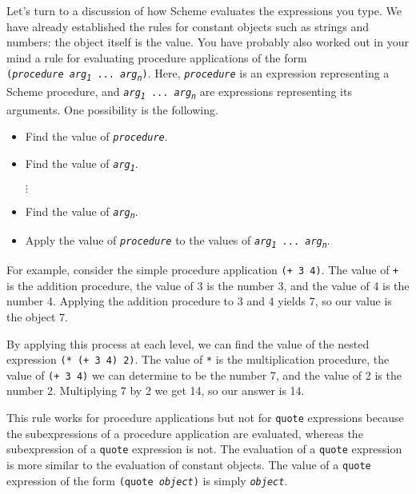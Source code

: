 Let's turn to a discussion of how Scheme evaluates the expressions
you type.
We have already established the rules for \label{start_s42}constant objects
such as strings and numbers: the object itself is the value.
You have probably also worked out in your mind a rule for evaluating
\label{start_s43}procedure applications of the form
\texttt{(\textit{procedure} \textit{arg\textsubscript{1}} ... \textit{arg\textsubscript{n}})}.
Here, \texttt{\textit{procedure}} is an expression representing a Scheme procedure,
and \texttt{\textit{arg\textsubscript{1}} ... \textit{arg\textsubscript{n}}} are expressions representing its
arguments.
One possibility is the following.

\begin{itemize}
\item 
Find the value of \texttt{\textit{procedure}}.

\item 
Find the value of \texttt{\textit{arg\textsubscript{1}}}.

\(\vdots\)
\item 
Find the value of \texttt{\textit{arg\textsubscript{n}}}.

\item 
Apply the value of \texttt{\textit{procedure}} to the values
of \texttt{\textit{arg\textsubscript{1}} ... \textit{arg\textsubscript{n}}}.

\end{itemize}


For example, consider the simple procedure application \texttt{(+ 3 4)}.
The value of \texttt{+} is the addition procedure, the value of 3
is the number 3, and the value of 4 is the number 4.
Applying the addition procedure to 3 and 4 yields 7, so our value
is the object 7.


By applying this process at each level, we can find the value of the
nested expression \texttt{(* (+ 3 4) 2)}.
The value of \texttt{*} is the multiplication procedure, the value of
\texttt{(+ 3 4)} we can determine to be the number 7, and the
value of 2 is the number 2.
Multiplying 7 by 2 we get 14, so our answer is 14.


This rule works for procedure applications but not
for
\label{start_s44}\label{start_s45}\texttt{quote} expressions
because the subexpressions of a procedure application are
evaluated, whereas the subexpression of a \texttt{quote} expression is
not.
The evaluation of a \texttt{quote} expression is more similar to the
evaluation of constant objects.
The value of a \texttt{quote} expression of the form
\texttt{(quote \textit{object})}
is simply \texttt{\textit{object}}.


